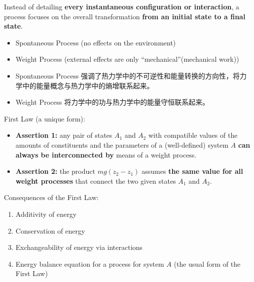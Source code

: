 \begin{defn}
\begin{enumerate}
\begin{zhu}
        Instead of detailing \textbf{every instantaneous configuration 
        or interaction}, a process focuses on the overall transformation \textbf{from an initial state to a final state}.
    \end{zhu}
\end{enumerate}
\end{defn}
\begin{defn}
    \par\indent
    \begin{itemize}
        \item Spontaneous Process (no effects on the environment)
        \item Weight Process (external effects are only ``mechanical''(mechanical work))
    \end{itemize}
    \begin{zhu}
    \par\indent
\begin{itemize}
    \item Spontaneous Process 强调了热力学中的不可逆性和能量转换的方向性，将力学中的能量概念与热力学中的熵增联系起来。
    \item Weight Process 将力学中的功与热力学中的能量守恒联系起来。
\end{itemize}
    \end{zhu}
\end{defn}
\begin{law}
    First Law (a unique form):
    \begin{itemize}
    \item \textbf{Assertion 1:} any pair of states \( A_1 \) and \( A_2 \) with 
    compatible values of the amounts of constituents and the parameters of 
    a (well-defined) system \( A \) \textbf{can always be interconnected by} means of a weight process.
    \item \textbf{Assertion 2:} the product \( mg(z_2 - z_1) \) assumes \textbf{the same value for all weight processes} that connect the two given states \( A_1 \) and \( A_2 \).
    \end{itemize}
\end{law}
\begin{corollary}
    Consequences of the First Law:
    \begin{enumerate}
        \item Additivity of energy
        \item Conservation of energy
        \item Exchangeability of energy via interactions
        \item Energy balance equation for a process for system \( A \) (the usual form of the First Law)
    \end{enumerate}
\end{corollary}
